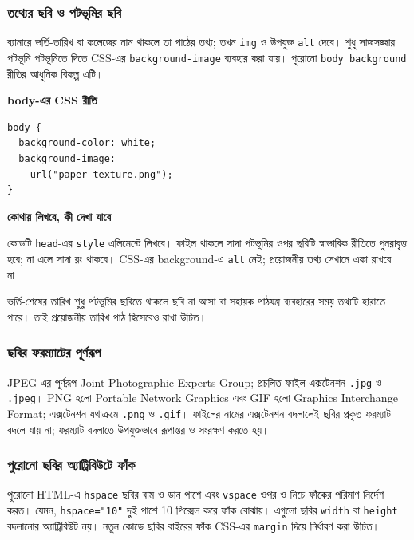 \subsubsection{তথ্যের ছবি ও পটভূমির ছবি}
ব্যানারে ভর্তি-তারিখ বা কলেজের নাম থাকলে তা পাঠের তথ্য; তখন \texttt{img} ও উপযুক্ত \texttt{alt} দেবে। শুধু সাজসজ্জার পটভূমি পটভূমিতে দিতে CSS-এর \texttt{background-image} ব্যবহার করা যায়। পুরোনো \texttt{body background} রীতির আধুনিক বিকল্প এটি।
\par\noindent\begin{minipage}[t]{.50\linewidth}\vspace{0pt}\small
\textbf{\color{chFourTeal}body-এর CSS রীতি}\par
\begin{verbatim}
body {
  background-color: white;
  background-image:
    url("paper-texture.png");
}
\end{verbatim}
\end{minipage}\hfill
\begin{minipage}[t]{.46\linewidth}\vspace{0pt}\small
\textbf{\color{chFourTeal}কোথায় লিখবে, কী দেখা যাবে}\par
কোডটি \texttt{head}-এর \texttt{style} এলিমেন্টে লিখবে। ফাইল থাকলে সাদা পটভূমির ওপর ছবিটি স্বাভাবিক রীতিতে পুনরাবৃত্ত হবে; না এলে সাদা রং থাকবে। CSS-এর background-এ \texttt{alt} নেই; প্রয়োজনীয় তথ্য সেখানে একা রাখবে না।
\end{minipage}\par
ভর্তি-শেষের তারিখ শুধু পটভূমির ছবিতে থাকলে ছবি না আসা বা সহায়ক পাঠযন্ত্র ব্যবহারের সময় তথ্যটি হারাতে পারে। তাই প্রয়োজনীয় তারিখ পাঠ হিসেবেও রাখা উচিত।


\subsubsection{ছবির ফরম্যাটের পূর্ণরূপ}
JPEG-এর পূর্ণরূপ Joint Photographic Experts Group; প্রচলিত ফাইল এক্সটেনশন \texttt{.jpg} ও \texttt{.jpeg}। PNG হলো Portable Network Graphics এবং GIF হলো Graphics Interchange Format; এক্সটেনশন যথাক্রমে \texttt{.png} ও \texttt{.gif}। ফাইলের নামের এক্সটেনশন বদলালেই ছবির প্রকৃত ফরম্যাট বদলে যায় না; ফরম্যাট বদলাতে উপযুক্তভাবে রূপান্তর ও সংরক্ষণ করতে হয়।

\subsubsection{পুরোনো ছবির অ্যাট্রিবিউটে ফাঁক}
পুরোনো HTML-এ \texttt{hspace} ছবির বাম ও ডান পাশে এবং \texttt{vspace} ওপর ও নিচে ফাঁকের পরিমাণ নির্দেশ করত। যেমন, \texttt{hspace="10"} দুই পাশে 10 পিক্সেল করে ফাঁক বোঝায়। এগুলো ছবির \texttt{width} বা \texttt{height} বদলানোর অ্যাট্রিবিউট নয়। নতুন কোডে ছবির বাইরের ফাঁক CSS-এর \texttt{margin} দিয়ে নির্ধারণ করা উচিত।
